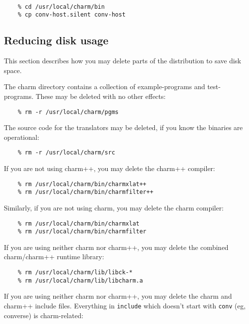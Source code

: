 \begin{verbatim}

    % cd /usr/local/charm/bin
    % cp conv-host.silent conv-host

\end{verbatim}

\subsection{Reducing disk usage}

This section describes how you may delete parts of the distribution to
save disk space.  

The charm directory contains a collection of example-programs and
test-programs.  These may be deleted with no other effects:

\begin{verbatim}
    % rm -r /usr/local/charm/pgms
\end{verbatim}

The source code for the translators may be deleted, if you know the
binaries are operational:

\begin{verbatim}
    % rm -r /usr/local/charm/src
\end{verbatim}

If you are not using charm++, you may delete the charm++ compiler:

\begin{verbatim}
    % rm /usr/local/charm/bin/charmxlat++
    % rm /usr/local/charm/bin/charmfilter++
\end{verbatim}

Similarly, if you are not using charm, you may delete the charm compiler:

\begin{verbatim}
    % rm /usr/local/charm/bin/charmxlat
    % rm /usr/local/charm/bin/charmfilter
\end{verbatim}

If you are using neither charm nor charm++, you may delete the
combined charm/charm++ runtime library:

\begin{verbatim}
    % rm /usr/local/charm/lib/libck-*
    % rm /usr/local/charm/lib/libcharm.a
\end{verbatim}

If you are using neither charm nor charm++, you may delete the charm
and charm++ include files.  Everything in {\tt include} which doesn't
start with {\tt conv} (eg, converse) is charm-related:

